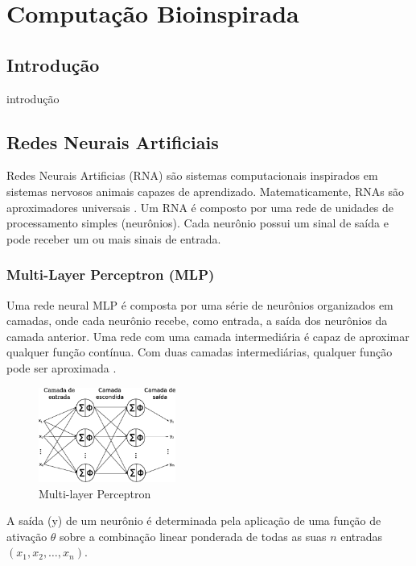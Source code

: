 \chapter{Computação Bioinspirada}
\label{bioinspirada}

\section{Introdução}

introdução

\section{Redes Neurais Artificiais}

Redes Neurais Artificias (RNA) são sistemas computacionais inspirados em sistemas
nervosos animais capazes de aprendizado. Matematicamente, RNAs são aproximadores
universais \cite{hornik89universal}. Um RNA é composto por uma rede de unidades
de processamento simples (neurônios). Cada neurônio possui um sinal de saída e
pode receber um ou mais sinais de entrada.

\subsection{Multi-Layer Perceptron (MLP)}

Uma rede neural MLP é composta por uma série de neurônios organizados em camadas, onde cada neurônio recebe, como entrada, a saída dos neurônios da camada anterior. Uma rede com uma camada intermediária é capaz de aproximar qualquer função contínua. Com duas camadas intermediárias, qualquer função pode ser aproximada \cite{cybenko89mlp}.

\begin{figure}[h]
    \centering
    \includegraphics[width=0.4\textwidth]{figures/mlp}
    \caption{Multi-layer Perceptron}
    \label{fig:mlp}
\end{figure}

A saída (y) de um neurônio é determinada pela aplicação de uma função de ativação \(\theta\) sobre a combinação linear ponderada de todas as suas \(n\) entradas \((x_1, x_2, \dots , x_n)\).

